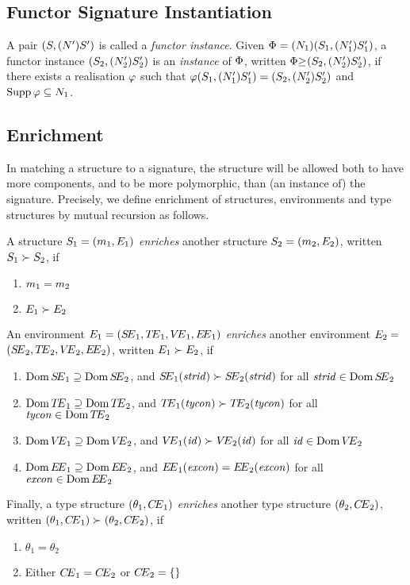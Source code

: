 \subsection{Functor Signature Instantiation}
A pair $(\S,(\N')\S')$ is called a {\sl functor instance}.
Given $\funsig=\longfunsig{1}$,
a functor instance $(\S_2,(\N_2')\S_2')$ is an {\sl instance} of
$\funsig$,
written $\funsiginst{\funsig}{}{(\S_2,(\N_2')\S_2')}$,
if there exists a realisation $\rea$
such that
$\rea(\S_1,(\N_1')\S_1')=(\S_2,(\N_2')\S_2')$ and
$\Supp\rea\subseteq\N_1$.
%
\subsection{Enrichment}
\label{enrichment-sec}
In matching a structure to a signature, the structure will be allowed both to
have more components, and to be more polymorphic, than (an instance of) the
signature.  Precisely, we  define enrichment of structures, environments and
type structures by mutual recursion as follows.

A structure $\S_1=(\m_1,\E_1)$
{\sl enriches} another structure
$\S_2=(\m_2,\E_2)$, written $\S_1\succ\S_2$, if
\begin{enumerate}
\item $\m_1=\m_2$
\item $\E_1\succ\E_2$
\end{enumerate}
An environment $\E_1=\longE{1}$
{\sl enriches} another environment $\E_2=$ $\longE{2}$,
written $\E_1\succ\E_2$,
if
\begin{enumerate}
\item $\Dom\SE_1\supseteq\Dom\SE_2$, and $\SE_1(\strid)\succ\SE_2(\strid)$
                                               for all $\strid\in\Dom\SE_2$
\item $\Dom\TE_1\supseteq\Dom\TE_2$, and $\TE_1(\tycon)\succ\TE_2(\tycon)$
                                               for all $\tycon\in\Dom\TE_2$
\item $\Dom\VE_1\supseteq\Dom\VE_2$, and $\VE_1(\id)\succ\VE_2(\id)$
                                               for all $\id\in\Dom\VE_2$
\item $\Dom\EE_1\supseteq\Dom\EE_2$, and $\EE_1(\exn)=\EE_2(\exn)$
                                               for all $\exn\in\Dom\EE_2$
\end{enumerate}
Finally, a type structure $(\theta_1,\CE_1)$
{\sl enriches} another type structure $(\theta_2,\CE_2)$,
written $(\theta_1,\CE_1)\succ(\theta_2,\CE_2)$,
if
\begin{enumerate}
\item $\theta_1=\theta_2$
\item Either $\CE_1=\CE_2$ or $\CE_2=\emptymap$
\end{enumerate}

